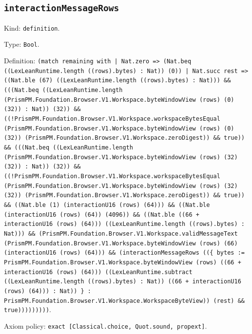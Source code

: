 \documentclass[11pt]{article}
\begin{document}
\subsection*{\texttt{interactionMessageRows}}
\noindent Kind: \texttt{definition}.\par
\noindent Type: \texttt{Bool}.\par
\noindent Definition: \texttt{(match remaining with | Nat.zero => (Nat.beq ((LexLeanRuntime.length ((rows).bytes) : Nat)) (0)) | Nat.succ rest => ((Nat.ble (67) ((LexLeanRuntime.length ((rows).bytes) : Nat))) \&\& (((Nat.beq ((LexLeanRuntime.length (PrismPM.Foundation.Browser.V1.Workspace.byteWindowView (rows) (0) (32)) : Nat)) (32)) \&\& ((!PrismPM.Foundation.Browser.V1.Workspace.workspaceBytesEqual (PrismPM.Foundation.Browser.V1.Workspace.byteWindowView (rows) (0) (32)) (PrismPM.Foundation.Browser.V1.Workspace.zeroDigest)) \&\& true)) \&\& (((Nat.beq ((LexLeanRuntime.length (PrismPM.Foundation.Browser.V1.Workspace.byteWindowView (rows) (32) (32)) : Nat)) (32)) \&\& ((!PrismPM.Foundation.Browser.V1.Workspace.workspaceBytesEqual (PrismPM.Foundation.Browser.V1.Workspace.byteWindowView (rows) (32) (32)) (PrismPM.Foundation.Browser.V1.Workspace.zeroDigest)) \&\& true)) \&\& ((Nat.ble (1) (interactionU16 (rows) (64))) \&\& ((Nat.ble (interactionU16 (rows) (64)) (4096)) \&\& ((Nat.ble ((66 + interactionU16 (rows) (64))) ((LexLeanRuntime.length ((rows).bytes) : Nat))) \&\& (PrismPM.Foundation.Browser.V1.Workspace.validMessageText (PrismPM.Foundation.Browser.V1.Workspace.byteWindowView (rows) (66) (interactionU16 (rows) (64))) \&\& (interactionMessageRows ((\{ bytes := PrismPM.Foundation.Browser.V1.Workspace.byteWindowView (rows) ((66 + interactionU16 (rows) (64))) ((LexLeanRuntime.subtract ((LexLeanRuntime.length ((rows).bytes) : Nat)) ((66 + interactionU16 (rows) (64))) : Nat)) \} : PrismPM.Foundation.Browser.V1.Workspace.WorkspaceByteView)) (rest) \&\& true)))))))))}.\par
\noindent Axiom policy: \texttt{exact [Classical.choice, Quot.sound, propext]}.\par
\end{document}
